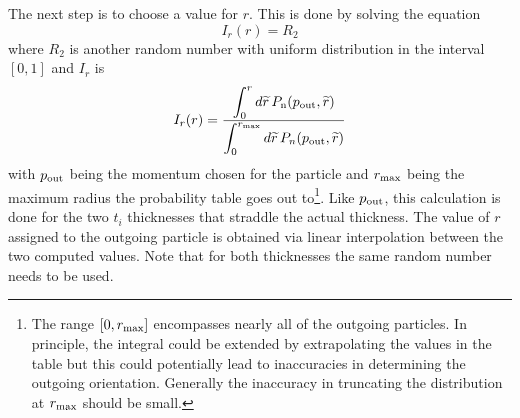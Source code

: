The next step is to choose a value for $r$. This is done by solving the equation
\begin{equation}
  I_r(r) = R_2
\end{equation}
where $R_2$ is another random number with uniform distribution in the interval $[0,1]$ and $I_r$ is 
\begin{equation}
  I_r(r) = \frac{\displaystyle \int_0^r d{\widetilde r} \, P_{\text{n}}(p_{\text{out}}, {\widetilde r})}
  {\displaystyle \int_0^{r_{\text{max}}} d{\widetilde r} \, P_{n}(p_{\text{out}}, {\widetilde r})}
\end{equation}
with $p_{\text{out}}$ being the momentum chosen for the particle and $r_{\text{max}}$ being the maximum
radius the probability table goes out to\footnote
  {
The range $[0,r_{\text{max}}]$ encompasses nearly all of the outgoing particles. In principle, the
integral could be extended by extrapolating the values in the table but this could potentially lead
to inaccuracies in determining the outgoing orientation. Generally the inaccuracy in truncating the
distribution at $r_{\text{max}}$ should be small.
  }. 
Like $p_{\text{out}}$, this calculation is done for the two
$t_i$ thicknesses that straddle the actual thickness. The value of $r$ assigned to the outgoing
particle is obtained via linear interpolation between the two computed values. Note that for both
thicknesses the same random number needs to be used.

